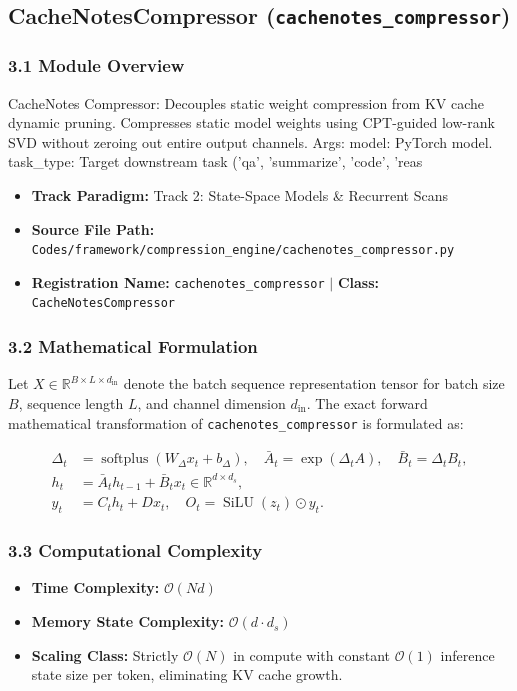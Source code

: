 \subsection{CacheNotesCompressor (\texttt{cachenotes\_compressor})}
\label{sec:app_module_cachenotes\_compressor}

\subsubsection*{3.1 Module Overview}
CacheNotes Compressor: Decouples static weight compression from KV cache dynamic pruning. Compresses static model weights using CPT-guided low-rank SVD without zeroing out entire output channels.  Args:     model: PyTorch model.     task\_type: Target downstream task ('qa', 'summarize', 'code', 'reas
\begin{itemize}
    \item \textbf{Track Paradigm:} Track 2: State-Space Models & Recurrent Scans
    \item \textbf{Source File Path:} \texttt{Codes/framework/compression\_engine/cachenotes\_compressor.py}
    \item \textbf{Registration Name:} \texttt{cachenotes\_compressor} $\mid$ \textbf{Class:} \texttt{CacheNotesCompressor}
\end{itemize}

\subsubsection*{3.2 Mathematical Formulation}
Let $X \in \mathbb{R}^{B \times L \times d_{\text{in}}}$ denote the batch sequence representation tensor for batch size $B$, sequence length $L$, and channel dimension $d_{\text{in}}$. The exact forward mathematical transformation of \texttt{cachenotes\_compressor} is formulated as:

\begin{align}
\Delta_t &= \operatorname{softplus}(W_\Delta x_t + b_\Delta), \quad \bar{A}_t = \exp(\Delta_t A), \quad \bar{B}_t = \Delta_t B_t, \\
h_t &= \bar{A}_t h_{t-1} + \bar{B}_t x_t \in \mathbb{R}^{d \times d_s}, \\
y_t &= C_t h_t + D x_t, \quad O_t = \operatorname{SiLU}(z_t) \odot y_t.
\end{align}


\subsubsection*{3.3 Computational Complexity}
\begin{itemize}
    \item \textbf{Time Complexity:} $\mathcal{O}(N d)$
    \item \textbf{Memory State Complexity:} $\mathcal{O}(d \cdot d_s)$
    \item \textbf{Scaling Class:} Strictly $\mathcal{O}(N)$ in compute with constant $\mathcal{O}(1)$ inference state size per token, eliminating KV cache growth.
\end{itemize}

